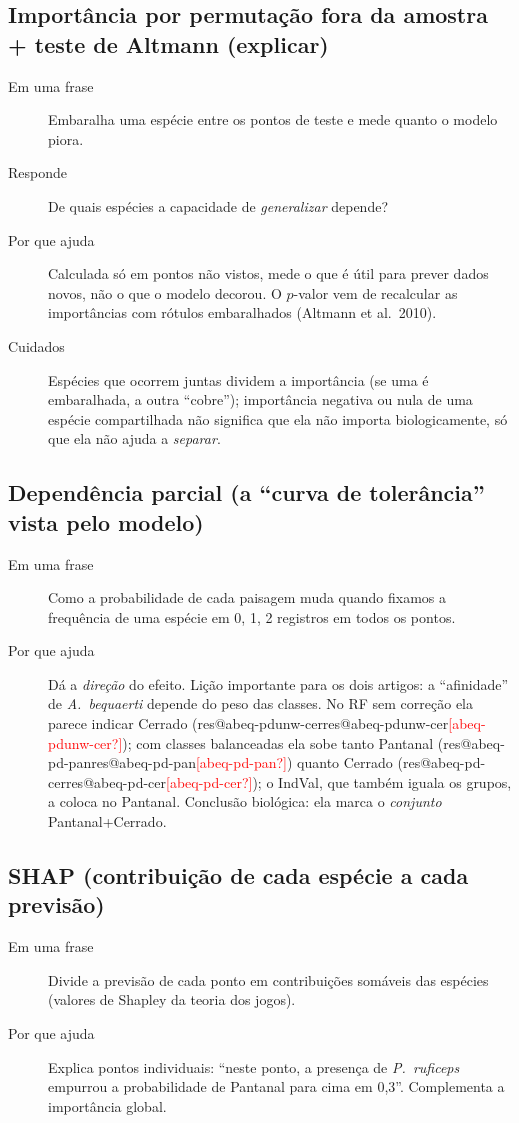 \documentclass[11pt,a4paper]{article}
\makeatletter
\newcommand{\res}[1]{\ifcsname res@#1\endcsname\csname res@#1\endcsname\else\textcolor{red}{[#1?]}\fi}
\newcommand{\taxon}[1]{\textit{#1}}
\makeatother
\begin{document}
\subsection{Importância por permutação fora da amostra + teste de Altmann (explicar)}
\begin{description}
\item[Em uma frase] Embaralha uma espécie entre os pontos de teste e mede quanto o modelo piora.
\item[Responde] De quais espécies a capacidade de \emph{generalizar} depende?
\item[Por que ajuda] Calculada só em pontos não vistos, mede o que é útil para prever dados novos,
não o que o modelo decorou. O $p$-valor vem de recalcular as importâncias com rótulos
embaralhados (Altmann et al.\ 2010).
\item[Cuidados] Espécies que ocorrem juntas dividem a importância (se uma é embaralhada, a outra
``cobre''); importância negativa ou nula de uma espécie compartilhada não significa que ela não
importa biologicamente, só que ela não ajuda a \emph{separar}.
\end{description}

\subsection{Dependência parcial (a ``curva de tolerância'' vista pelo modelo)}
\begin{description}
\item[Em uma frase] Como a probabilidade de cada paisagem muda quando fixamos a frequência de uma
espécie em 0, 1, 2 registros em todos os pontos.
\item[Por que ajuda] Dá a \emph{direção} do efeito. Lição importante para os dois artigos: a
``afinidade'' de \taxon{A.~bequaerti} depende do peso das classes. No RF sem correção ela parece
indicar Cerrado (\res{abeq-pdunw-cer}); com classes balanceadas ela sobe tanto Pantanal
(\res{abeq-pd-pan}) quanto Cerrado (\res{abeq-pd-cer}); o IndVal, que também iguala os grupos, a
coloca no Pantanal. Conclusão biológica: ela marca o \emph{conjunto} Pantanal+Cerrado.
\end{description}

\subsection{SHAP (contribuição de cada espécie a cada previsão)}
\begin{description}
\item[Em uma frase] Divide a previsão de cada ponto em contribuições somáveis das espécies (valores
de Shapley da teoria dos jogos).
\item[Por que ajuda] Explica pontos individuais: ``neste ponto, a presença de \taxon{P.~ruficeps}
empurrou a probabilidade de Pantanal para cima em 0,3''. Complementa a importância global.
\end{description}
\end{document}
